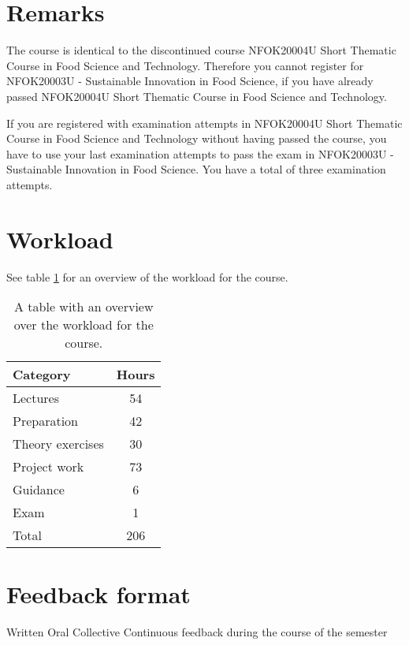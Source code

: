 \section*{Remarks}
The course is identical to the discontinued course NFOK20004U Short Thematic Course in Food Science and Technology. Therefore you cannot register for NFOK20003U - Sustainable Innovation in Food Science, if you have already passed NFOK20004U Short Thematic Course in Food Science and Technology.

If you are registered with examination attempts in NFOK20004U Short Thematic Course in Food Science and Technology without having passed the course, you have to use your last examination attempts to pass the exam in NFOK20003U - Sustainable Innovation in Food Science. You have a total of three examination attempts.


\section*{Workload}
See table \ref{tab:workload_01} for an overview of the workload for the course. 
\begin{table}[h]
    \centering
    \caption{A table with an overview over the workload for the course.}
    \label{tab:workload_01}
    \begin{tabular}{ l | c}
        \textbf{Category} & \textbf{Hours} \\ 
        \hline
        Lectures & 54 \\ 

        Preparation & 42 \\

        Theory exercises & 30 \\ 

        Project work & 73 \\

        Guidance & 6 \\

        Exam & 1 \\ 
        \hline
        Total & 206 \\ 
    \end{tabular}
\end{table}

\section*{Feedback format}
Written
Oral
Collective
Continuous feedback during the course of the semester

